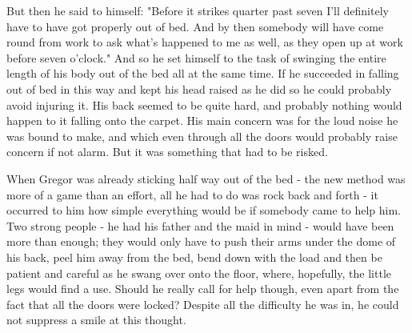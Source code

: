 \documentclass[12pt]{book}
\begin{document}
    But then he said to himself: "Before it strikes quarter past seven I'll definitely have to have got properly out of bed. And by then somebody will have come round from work to ask what's happened to me as well, as they open up at work before seven o'clock." And so he set himself to the task of swinging the entire length of his body out of the bed all at the same time. If he succeeded in falling out of bed in this way and kept his head raised as he did so he could probably avoid injuring it. His back seemed to be quite hard, and probably nothing would happen to it falling onto the carpet. His main concern was for the loud noise he was bound to make, and which even through all the doors would probably raise concern if not alarm. But it was something that had to be risked.

    When Gregor was already sticking half way out of the bed - the new method was more of a game than an effort, all he had to do was rock back and forth - it occurred to him how simple everything would be if somebody came to help him. Two strong people - he had his father and the maid in mind - would have been more than enough; they would only have to push their arms under the dome of his back, peel him away from the bed, bend down with the load and then be patient and careful as he swang over onto the floor, where, hopefully, the little legs would find a use. Should he really call for help though, even apart from the fact that all the doors were locked? Despite all the difficulty he was in, he could not suppress a smile at this thought.
\end{document}
